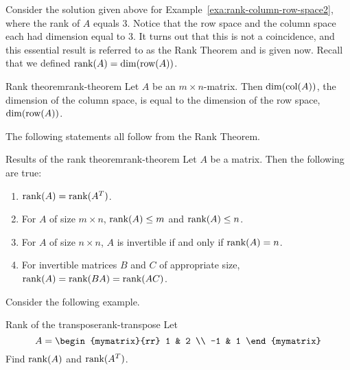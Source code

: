 Consider the solution given above for
Example~\ref{exa:rank-column-row-space2}, where the rank of $A$ equals
$3$. Notice that the row space and the column space each had dimension
equal to $3$. It turns out that this is not a coincidence, and this
essential result is referred to as the Rank Theorem and is given
now. Recall that we defined $\mbox{\rm rank}(A) = \dim(\mbox{\rm row}(A))$.

\begin{theorem}{Rank theorem}{rank-theorem}
  Let $A$ be an $m \times n$-matrix. Then $\dim(\mbox{\rm col} (A))$, the
  dimension of the column space, is equal to the dimension of the row
  space, $\dim(\mbox{\rm row}(A))$.
\end{theorem}

The following statements all follow from the Rank Theorem.

\begin{corollary}{Results of the rank theorem}{rank-theorem}
  Let $A$ be a matrix. Then the following are true:
  \begin{enumerate}
  \item $\mbox{\rm rank}(A) = \mbox{\rm rank}(A^T)$.
  \item For $A$ of size $m \times n$, $\mbox{\rm rank}(A) \leq m$ and
    $\mbox{\rm rank}(A) \leq n$.
  \item For $A$ of size $n \times n$, $A$ is invertible if and only if
    $\mbox{\rm rank}(A) = n$.
  \item For invertible matrices $B$ and $C$ of appropriate size,
    $\mbox{\rm rank}(A) = \mbox{\rm rank}(BA) = \mbox{\rm rank}(AC)$.
  \end{enumerate}
\end{corollary}

Consider the following example.

\begin{example}{Rank of the transpose}{rank-transpose}
  Let \begin{equation*}
    A =
    \begin{mymatrix}{rr}
      1 & 2 \\
      -1 & 1
    \end{mymatrix}
  \end{equation*}
  Find $\mbox{\rm rank}(A)$ and $\mbox{\rm rank}(A^T)$.
\end{example}

